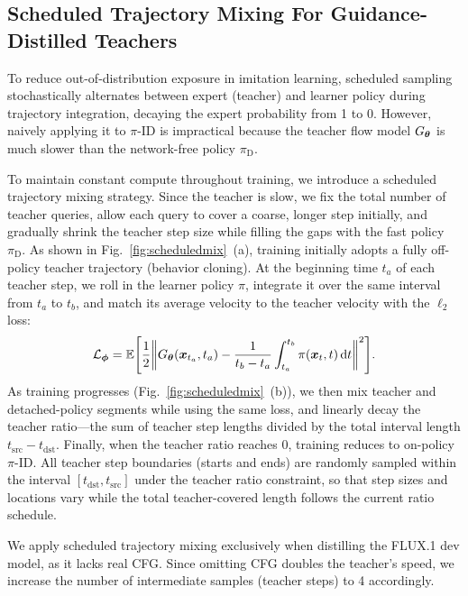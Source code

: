\subsection{Scheduled Trajectory Mixing For Guidance-Distilled Teachers}
\label{sec:scheduled}

To reduce out-of-distribution exposure in imitation learning, scheduled sampling~\citep{scheduledsampling} stochastically alternates between expert (teacher) and learner policy during trajectory integration, decaying the expert probability from 1 to 0. However, naively applying it to $\pi$-ID is impractical because the teacher flow model $G_{\bm{\theta}}$ is much slower than the network-free policy $\pi_{\text{D}}$.

To maintain constant compute throughout training, we introduce a scheduled trajectory mixing strategy. Since the teacher is slow, we fix the total number of teacher queries, allow each query to cover a coarse, longer step initially, and gradually shrink the teacher step size while filling the gaps with the fast policy $\pi_{\text{D}}$. As shown in Fig.~\ref{fig:scheduledmix}~(a), training initially adopts a fully off-policy teacher trajectory (behavior cloning). At the beginning time $t_a$ of each teacher step, we roll in the learner policy $\pi$, integrate it over the same interval from $t_a$ to $t_b$, and match its average velocity to the teacher velocity with the $\ell_2$ loss:
\begin{align}
    \mathcal{L}_\vphi = \E\left[\frac{1}{2}\left\| 
        G_\vtheta(\vx_{t_a},t_a) - \frac{1}{t_b - t_a}\int_{t_a}^{t_b}\pi(\vx_t,t) \diff t
    \right\|^2\right].
\end{align}
As training progresses (Fig.~\ref{fig:scheduledmix}~(b)), we then mix teacher and detached-policy segments while using the same loss, and linearly decay the teacher ratio---the sum of teacher step lengths divided by the total interval length $t_\text{src} - t_\text{dst}$. 
Finally, when the teacher ratio reaches 0, training reduces to on-policy $\pi$-ID. All teacher step boundaries (starts and ends) are randomly sampled within the interval $[t_\text{dst}, t_\text{src}]$ under the teacher ratio constraint, so that step sizes and locations vary while the total teacher-covered length follows the current ratio schedule.

We apply scheduled trajectory mixing exclusively when distilling the FLUX.1 dev model, as it lacks real CFG. Since omitting CFG doubles the teacher's speed, we increase the number of intermediate samples (teacher steps) to 4 accordingly.

